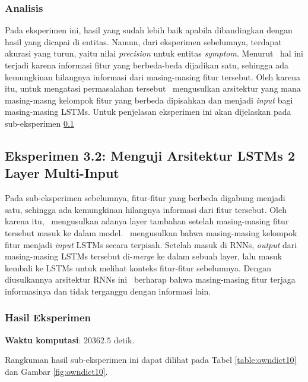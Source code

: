     \subsubsection{Analisis}
    Pada eksperimen ini, hasil yang sudah lebih baik apabila dibandingkan dengan hasil yang dicapai \cite{skripsiKakRadit} di entitas. Namun, dari eksperimen sebelumnya, terdapat akurasi yang turun, yaitu nilai \textit{precision} untuk entitas \textit{symptom}. Menurut \saya~hal ini terjadi karena informasi fitur yang berbeda-beda dijadikan satu, sehingga ada kemungkinan hilangnya informasi dari masing-masing fitur tersebut. Oleh karena itu, untuk mengatasi permasalahan tersebut \saya~mengusulkan arsitektur yang mana masing-masng kelompok fitur yang berbeda dipisahkan dan menjadi \textit{input} bagi masing-masing LSTMs. Untuk penjelasan eksperimen ini akan dijelaskan pada sub-eksperimen \ref{eks2:subeksrnn2}
    
    
    \subsection{Eksperimen 3.2: Menguji Arsitektur LSTMs 2 Layer Multi-Input}\label{eks2:subeksrnn2}
    Pada sub-eksperimen sebelumnya, fitur-fitur yang berbeda digabung menjadi satu, sehingga ada kemungkinan hilangnya informasi dari fitur tersebut. Oleh karena itu, \saya~mengusulkan adanya layer tambahan setelah masing-masing fitur tersebut masuk ke dalam model. \Saya~mengusulkan bahwa masing-masing kelompok fitur menjadi \textit{input} LSTMs secara terpisah. Setelah masuk di RNNs, \textit{output} dari masing-masing LSTMs tersebut di-\textit{merge} ke dalam sebuah layer, lalu masuk kembali ke LSTMs untuk melihat konteks fitur-fitur sebelumnya. Dengan diusulkannya arsitektur RNNs ini \saya~berharap bahwa masing-masing fitur terjaga informasinya dan tidak terganggu dengan informasi lain.
    
    \subsubsection{Hasil Eksperimen}
    \textbf{Waktu komputasi}: $ 20362.5 $ detik.
    
    Rangkuman hasil sub-eksperimen ini dapat dilihat pada Tabel \ref{table:owndict10} dan Gambar \ref{fig:owndict10}.
        

